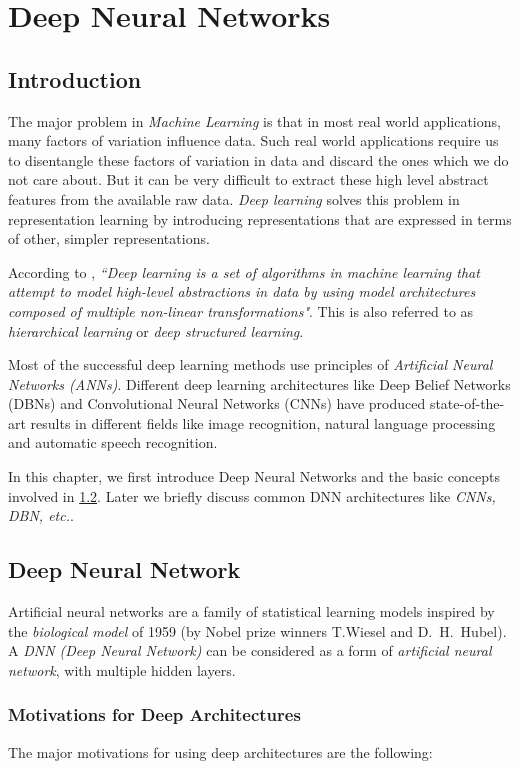 \chapter{Deep Neural Networks}
\label{chap:dnn}
\section{Introduction}
The major problem in \textit{Machine Learning} is that in most real world applications, many factors of variation influence data.  Such real world applications require us to disentangle these factors of variation in data and discard the ones which we do not care about.  But it can be very difficult to extract these high level abstract features from the available raw data.  \textit{Deep learning} solves this problem in representation learning by introducing representations that are expressed in terms of other, simpler representations.

According to \citet{deng2014deep}, \textit{``Deep learning is a set of algorithms in machine learning that attempt to model high-level abstractions in data by using model architectures composed of multiple non-linear transformations"}.  This is also referred to as \textit{hierarchical learning} or \textit{deep structured learning}. 

Most of the successful deep learning methods use principles of \textit{Artificial Neural Networks (ANNs)}.  Different deep learning architectures like Deep Belief Networks (DBNs) and Convolutional Neural Networks (CNNs) have produced state-of-the-art results in different fields like image recognition, natural language processing and automatic speech recognition.

In this chapter, we first introduce Deep Neural Networks and the basic concepts involved in \ref{sec:dnn:dnn}.  Later we briefly discuss common DNN architectures like \textit{CNNs, DBN, etc.}.

\section{Deep Neural Network}
\label{sec:dnn:dnn}
Artificial neural networks are a family of statistical learning models inspired by the \textit{biological model} of 1959 (by Nobel prize winners T.Wiesel and D.~H.~Hubel).  A \textit{DNN (Deep Neural Network)} can be considered as a form of \textit{artificial neural network}, with multiple hidden layers. 


\subsection{Motivations for Deep Architectures}
The major motivations for using deep architectures are the following:

